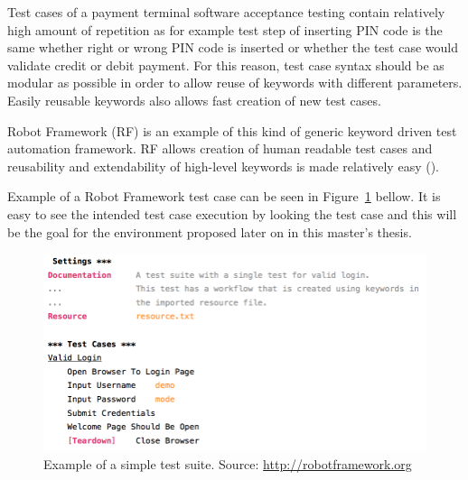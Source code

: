 Test cases of a payment terminal software acceptance testing contain relatively high amount of repetition as for example test step of inserting PIN code is the same whether right or wrong PIN code is inserted or whether the test case would validate credit or debit payment. For this reason, test case syntax should be as modular as possible in order to allow reuse of keywords with different parameters. Easily reusable keywords also allows fast creation of new test cases.

Robot Framework (RF) is an example of this kind of generic keyword driven test automation framework. RF allows creation of human readable test cases and reusability and extendability of high-level keywords is made relatively easy (\emph{\cite{stresnjak2011usage}}).

Example of a Robot Framework test case can be seen in Figure~\ref{fig:robot_example} bellow. It is easy to see the intended test case execution by looking the test case and this will be the goal for the environment proposed later on in this master's thesis.

\begin{figure}[ht]
  \begin{center}
    \includegraphics[width=12cm]{images/robot_example.png}
    \caption{Example of a simple test suite. Source: \url{http://robotframework.org}}
    \label{fig:robot_example}
  \end{center}
\end{figure}
